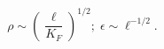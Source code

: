\begin{equation}
\label{scale4}
\rho \sim (\frac{\ell}{K_F})^{1/2};\;\epsilon \sim \ell^{-1/2}.
\end{equation}

